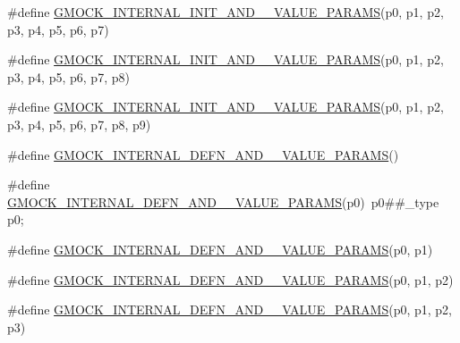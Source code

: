 \begin{DoxyCompactItemize}
\item 
\#define \mbox{\hyperlink{_obj__test_2lib_2googletest-master_2googlemock_2include_2gmock_2gmock-generated-actions_8h_a12a0e970438c008214093b98b8eefa68}{G\+M\+O\+C\+K\+\_\+\+I\+N\+T\+E\+R\+N\+A\+L\+\_\+\+I\+N\+I\+T\+\_\+\+A\+N\+D\+\_\+\_\+\+V\+A\+L\+U\+E\+\_\+\+P\+A\+R\+A\+MS}}(p0,  p1,  p2,  p3,  p4,  p5,  p6,  p7)
\item 
\#define \mbox{\hyperlink{_obj__test_2lib_2googletest-master_2googlemock_2include_2gmock_2gmock-generated-actions_8h_aa69890581b384540649239847bd7dcbf}{G\+M\+O\+C\+K\+\_\+\+I\+N\+T\+E\+R\+N\+A\+L\+\_\+\+I\+N\+I\+T\+\_\+\+A\+N\+D\+\_\+\_\+\+V\+A\+L\+U\+E\+\_\+\+P\+A\+R\+A\+MS}}(p0,  p1,  p2,  p3,  p4,  p5,  p6,  p7,  p8)
\item 
\#define \mbox{\hyperlink{_obj__test_2lib_2googletest-master_2googlemock_2include_2gmock_2gmock-generated-actions_8h_aeed917d405a99878e11d53b8eca2b744}{G\+M\+O\+C\+K\+\_\+\+I\+N\+T\+E\+R\+N\+A\+L\+\_\+\+I\+N\+I\+T\+\_\+\+A\+N\+D\+\_\+\_\+\+V\+A\+L\+U\+E\+\_\+\+P\+A\+R\+A\+MS}}(p0,  p1,  p2,  p3,  p4,  p5,  p6,  p7,  p8,  p9)
\item 
\#define \mbox{\hyperlink{_obj__test_2lib_2googletest-master_2googlemock_2include_2gmock_2gmock-generated-actions_8h_a3fef729577c726683358d924c3d31c18}{G\+M\+O\+C\+K\+\_\+\+I\+N\+T\+E\+R\+N\+A\+L\+\_\+\+D\+E\+F\+N\+\_\+\+A\+N\+D\+\_\+\_\+\+V\+A\+L\+U\+E\+\_\+\+P\+A\+R\+A\+MS}}()
\item 
\#define \mbox{\hyperlink{_obj__test_2lib_2googletest-master_2googlemock_2include_2gmock_2gmock-generated-actions_8h_a9a2a07e6eff8e4ca6d45b8f7ea11cf3b}{G\+M\+O\+C\+K\+\_\+\+I\+N\+T\+E\+R\+N\+A\+L\+\_\+\+D\+E\+F\+N\+\_\+\+A\+N\+D\+\_\+\_\+\+V\+A\+L\+U\+E\+\_\+\+P\+A\+R\+A\+MS}}(p0)~p0\#\#\+\_\+type p0;
\item 
\#define \mbox{\hyperlink{_obj__test_2lib_2googletest-master_2googlemock_2include_2gmock_2gmock-generated-actions_8h_a16aa4a04e77951b00534396170438deb}{G\+M\+O\+C\+K\+\_\+\+I\+N\+T\+E\+R\+N\+A\+L\+\_\+\+D\+E\+F\+N\+\_\+\+A\+N\+D\+\_\+\_\+\+V\+A\+L\+U\+E\+\_\+\+P\+A\+R\+A\+MS}}(p0,  p1)
\item 
\#define \mbox{\hyperlink{_obj__test_2lib_2googletest-master_2googlemock_2include_2gmock_2gmock-generated-actions_8h_a584f78b5777db084208f151d7e4d51b7}{G\+M\+O\+C\+K\+\_\+\+I\+N\+T\+E\+R\+N\+A\+L\+\_\+\+D\+E\+F\+N\+\_\+\+A\+N\+D\+\_\+\_\+\+V\+A\+L\+U\+E\+\_\+\+P\+A\+R\+A\+MS}}(p0,  p1,  p2)
\item 
\#define \mbox{\hyperlink{_obj__test_2lib_2googletest-master_2googlemock_2include_2gmock_2gmock-generated-actions_8h_a1c04daeff7ae92839f33727e264f227f}{G\+M\+O\+C\+K\+\_\+\+I\+N\+T\+E\+R\+N\+A\+L\+\_\+\+D\+E\+F\+N\+\_\+\+A\+N\+D\+\_\+\_\+\+V\+A\+L\+U\+E\+\_\+\+P\+A\+R\+A\+MS}}(p0,  p1,  p2,  p3)

\end{DoxyCompactItemize}
